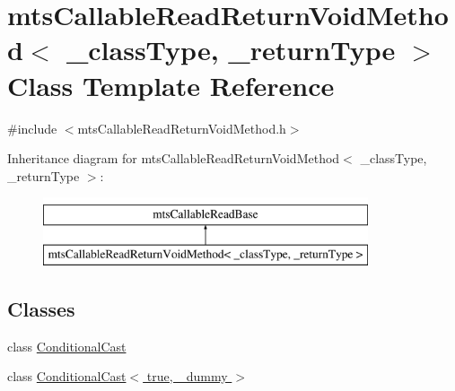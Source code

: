 \hypertarget{classmts_callable_read_return_void_method}{}\section{mts\+Callable\+Read\+Return\+Void\+Method$<$ \+\_\+class\+Type, \+\_\+return\+Type $>$ Class Template Reference}
\label{classmts_callable_read_return_void_method}


{\ttfamily \#include $<$mts\+Callable\+Read\+Return\+Void\+Method.\+h$>$}

Inheritance diagram for mts\+Callable\+Read\+Return\+Void\+Method$<$ \+\_\+class\+Type, \+\_\+return\+Type $>$\+:\begin{figure}[H]
\begin{center}
\leavevmode
\includegraphics[height=2.000000cm]{d0/d8b/classmts_callable_read_return_void_method}
\end{center}
\end{figure}
\subsection*{Classes}
\begin{DoxyCompactItemize}
\item 
class \hyperlink{classmts_callable_read_return_void_method_1_1_conditional_cast}{Conditional\+Cast}
\item 
class \hyperlink{classmts_callable_read_return_void_method_1_1_conditional_cast_3_01true_00_01__dummy_01_4}{Conditional\+Cast$<$ true, \+\_\+dummy $>$}
\end{DoxyCompactItemize}
